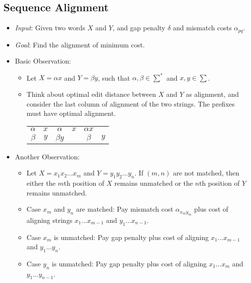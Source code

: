\documentclass[12pt]{article}
\begin{document}
\subsection{Sequence Alignment}
\begin{itemize}
    \item \textit{Input}: Given two words $X$ and $Y$, and gap penalty $\delta$ and mismatch costs $\alpha_{pq}$.
    \item \textit{Goal}: Find the alignment of minimum cost.
    \item Basic Observation:
    \begin{itemize}
        \item Let $X = \alpha x$ and $Y = \beta y$, such that $\alpha, \beta \in \sum^{\ast}$ and $x, y \in \sum$.
        \item Think about optimal edit distance between $X$ and $Y$ as alignment, and consider the last column of alignment of the two strings. The prefixes must have optimal alignment.
        \begin{center}
            \begin{tabular}{c c | c c | c c}
                $\alpha$ & $x$ & $\alpha$ & $x$ & $\alpha x$ & \\
                $\beta$ & $y$ & $\beta y$ &  & $\beta$ & $y$ \\
            \end{tabular}
        \end{center}
    \end{itemize}
    \item Another Observation:
    \begin{itemize}
        \item Let $X = x_1x_2...x_m$ and $Y = y_1y_2...y_n$. If $(m, n)$ are not matched, then either the $m$th position of $X$ remains unmatched or the $n$th position of $Y$ remains unmatched.
        \item Case $x_m$ and $y_n$ are matched: Pay mismatch cost $\alpha_{x_my_m}$ plus cost of aligning strings $x_1...x_{m-1}$ and $y_1...x_{n-1}$.
        \item Case $x_m$ is unmatched: Pay gap penalty plus cost of aligning $x_1...x_{m-1}$ and $y_1...y_n$.
        \item Case $y_n$ is unmatched: Pay gap penalty plus cost of aligning $x_1...x_m$ and $y_1...y_{n-1}$.
    \end{itemize}
\end{itemize}
\end{document}
